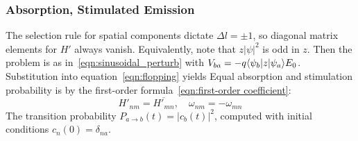 \subsubsection{Absorption, Stimulated Emission}
The selection rule for spatial 
components dictate $\Delta l = \pm 1$, so diagonal matrix elements for $H'$ always vanish.
Equivalently, note that 
$z|\psi|^2$ is odd in $z$. Then the problem is as in~\ref{eqn:sinusoidal_perturb} with 
$V_{ba}=-q\langle \psi_b|z|\psi_a\rangle E_0$. Substitution into equation~\ref{eqn:flopping} yields 
Equal absorption and stimulation probability is by 
the first-order formula~\ref{eqn:first-order coefficient}: 
\[ 
    H'_{nm} = \overline{H'_{mn}}, \quad \omega_{nm} = -\omega_{mn}
\] 
The transition probability $P_{a\to b}(t) = |c_b(t)|^2$, computed with 
initial conditions $c_n(0) = \delta_{na}$. 


